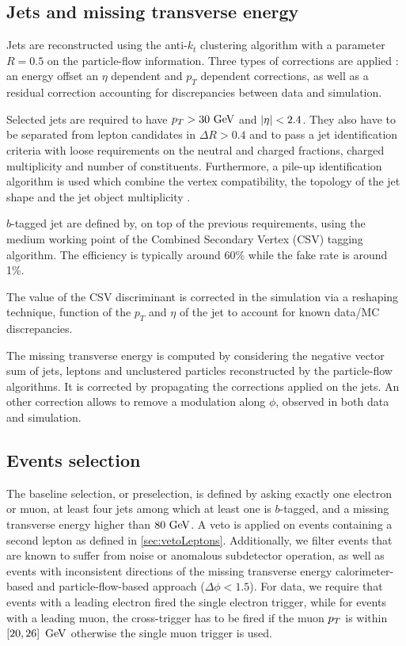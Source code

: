         \subsection{Jets and missing transverse energy}

       Jets are reconstructed using the anti-$k_t$ clustering algorithm with a parameter $R = 0.5$ on the particle-flow
       information. Three types of corrections are applied : an energy offset an $\eta$ dependent and $p_T$ dependent
       corrections, as well as a residual correction accounting for discrepancies between data and simulation.

       Selected jets are required to have $p_T > 30 ~\text{GeV}$ and $\left| \eta \right| < 2.4$. They also have to be separated from
       lepton candidates in $\Delta R > 0.4$ and to pass a jet identification criteria  with loose
       requirements on the neutral and charged fractions, charged multiplicity and number of constituents. Furthermore,
       a pile-up identification algorithm is used which combine the vertex compatibility, the topology of the jet shape 
       and the jet object multiplicity .

       $b$-tagged jet are defined by, on top of the previous requirements, using the medium working point of the 
       Combined Secondary Vertex (CSV) tagging algorithm. The efficiency is typically around 60\% while the fake rate is
       around 1\%.

       The value of the CSV discriminant is corrected in the simulation via a reshaping technique, function of the 
       $p_T$ and $\eta$ of the jet to account for known data/MC discrepancies.

       The missing transverse energy is computed by considering the negative vector sum of jets, leptons and 
       unclustered particles reconstructed by the particle-flow algorithms. It is corrected by propagating the 
       corrections applied on the jets. An other correction allows to remove a modulation along $\phi$, observed 
       in both data and simulation.

        \subsection{Events selection}

        The baseline selection, or preselection, is defined by asking exactly one electron or muon, at least 
        four jets among which at least one is $b$-tagged, and a missing transverse energy higher than $80 ~\text{GeV}$.
        A veto is applied on events containing a second lepton as defined in \ref{sec:vetoLeptons}. Additionally,
        we filter events that are known to suffer from noise or anomalous subdetector operation, as well as events
        with inconsistent directions of the missing transverse energy calorimeter-based and particle-flow-based
        approach ($\Delta \phi < 1.5$). For data, we require that events with a leading electron fired the single
        electron trigger, while for events with a leading muon, the cross-trigger has to be fired if the muon $p_T$
        is within $\left[ 20, 26 \right] ~\text{GeV}$ otherwise the single muon trigger is used.

